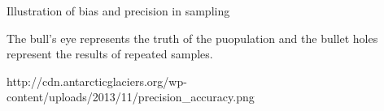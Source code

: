Illustration of bias and precision in sampling

The bull's eye represents the truth of the puopulation and the bullet holes represent the results of repeated samples.


http://cdn.antarcticglaciers.org/wp-content/uploads/2013/11/precision_accuracy.png
